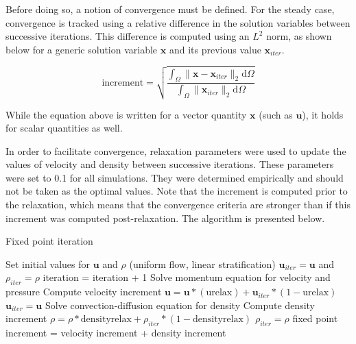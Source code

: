 \documentclass[12pt]{article}
\begin{document}
Before doing so, a notion of convergence must be defined. For the steady case, convergence is tracked using a relative difference in the solution variables between successive iterations. This difference is computed using an $L^2$ norm, as shown below for a generic solution variable $\mathbf{x}$ and its previous value $\mathbf{x}_{iter}$.

\begin{equation}
\label{eq:l2}
\text{increment} = \sqrt{\frac{\int_\Omega\lVert\mathbf{x}-\mathbf{x}_{iter}\rVert_2\text{d}\Omega}{\int_\Omega\lVert\mathbf{x}_{iter}\rVert_2\text{d}\Omega}}
\end{equation}
 
While the equation above is written for a vector quantity $\mathbf{x}$ (such as $\mathbf{u}$), it holds for scalar quantities as well.

In order to facilitate convergence, relaxation parameters were used to update the values of velocity and density between successive iterations. These parameters were set to 0.1 for all simulations. They were determined empirically and should not be taken as the optimal values. Note that the increment is computed prior to the relaxation, which means that the convergence criteria are stronger than if this increment was computed post-relaxation. The algorithm is presented below.

\begin{algorithm}[H]
	\caption{Fixed point iteration}\label{fixedpoint}
	\begin{algorithmic}[1]

		\State Set initial values for $\mathbf{u}$ and $\rho$ (uniform flow, linear stratification)
		\State $\mathbf{u}_{iter} = \mathbf{u}$ and $\rho_{iter}=\rho$
		\State iteration = iteration + 1
		\State Solve momentum equation for velocity and pressure
		\State Compute velocity increment
		\State $\mathbf{u} = \mathbf{u}*(\text{urelax}) + \mathbf{u}_{iter}*(1-\text{urelax})$
		\State $\mathbf{u}_{iter}=\mathbf{u}$
		\State Solve convection-diffusion equation for density
		\State Compute density increment
		\State $\rho = \rho*\text{densityrelax}+\rho_{iter}*(1-\text{densityrelax})$
		\State $\rho_{iter}=\rho$
		\State fixed point increment = velocity increment + density increment
		\EndWhile

	\end{algorithmic}
\end{algorithm}
\end{document}
